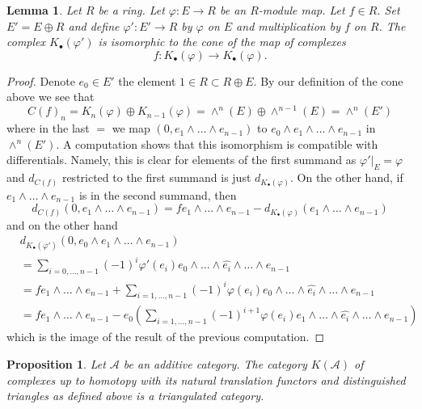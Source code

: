 \documentclass{amsart}
\theoremstyle{plain}
\newtheorem{proposition}[subsection]{Proposition}
\newtheorem{lemma}[subsection]{Lemma}
\theoremstyle{definition}
\theoremstyle{remark}
\numberwithin{equation}{subsection}
\begin{document}
\begin{lemma}
\label{more-algebra-lemma-cone-koszul-abstract}
Let $R$ be a ring. Let $\varphi : E \to R$ be an $R$-module map.
Let $f \in R$. Set $E' = E \oplus R$ and define $\varphi' : E' \to R$
by $\varphi$ on $E$ and multiplication by $f$ on $R$.
The complex $K_\bullet(\varphi')$ is isomorphic to the
cone of the map of complexes
$$
f :
K_\bullet(\varphi)
\longrightarrow
K_\bullet(\varphi).
$$
\end{lemma}

\begin{proof}
Denote $e_0 \in E'$ the element $1 \in R \subset R \oplus E$.
By our definition of the cone above we see that
$$
C(f)_n = K_n(\varphi) \oplus K_{n - 1}(\varphi) =
\wedge^n(E) \oplus \wedge^{n - 1}(E) = \wedge^n(E')
$$
where in the last $=$ we map $(0, e_1 \wedge \ldots \wedge e_{n - 1})$
to $e_0 \wedge e_1 \wedge \ldots \wedge e_{n - 1}$ in $\wedge^n(E')$.
A computation shows that this isomorphism is compatible with
differentials. Namely, this is clear for elements of the first
summand as $\varphi'|_E = \varphi$ and $d_{C(f)}$ restricted to
the first summand is just $d_{K_\bullet(\varphi)}$.
On the other hand, if $e_1 \wedge \ldots \wedge e_{n - 1}$
is in the second summand, then
$$
d_{C(f)}(0, e_1 \wedge \ldots \wedge e_{n - 1}) =
fe_1 \wedge \ldots \wedge e_{n - 1}
- d_{K_\bullet(\varphi)}(e_1 \wedge \ldots \wedge e_{n - 1})
$$
and on the other hand
\begin{align*}
& d_{K_\bullet(\varphi')}(0, e_0 \wedge e_1 \wedge \ldots \wedge e_{n - 1}) \\
& =
\sum\nolimits_{i = 0, \ldots, n - 1}
(-1)^i \varphi'(e_i)e_0 \wedge \ldots \wedge \widehat{e_i}
\wedge \ldots \wedge e_{n - 1} \\
& =
fe_1 \wedge \ldots \wedge e_{n - 1} +
\sum\nolimits_{i = 1, \ldots, n - 1}
(-1)^i \varphi(e_i)e_0 \wedge \ldots \wedge \widehat{e_i}
\wedge \ldots \wedge e_{n - 1} \\
& =
fe_1 \wedge \ldots \wedge e_{n - 1} -
e_0 \left(\sum\nolimits_{i = 1, \ldots, n - 1}
(-1)^{i + 1} \varphi(e_i)e_1 \wedge \ldots \wedge \widehat{e_i}
\wedge \ldots \wedge e_{n - 1}\right)
\end{align*}
which is the image of the result of the previous computation.
\end{proof}


\begin{proposition}
\label{derived-proposition-homotopy-category-triangulated}
Let $\mathcal{A}$ be an additive category.
The category $K(\mathcal{A})$ of complexes up to
homotopy with its natural translation functors
and distinguished triangles as defined above
is a triangulated category.
\end{proposition}
\end{document}
